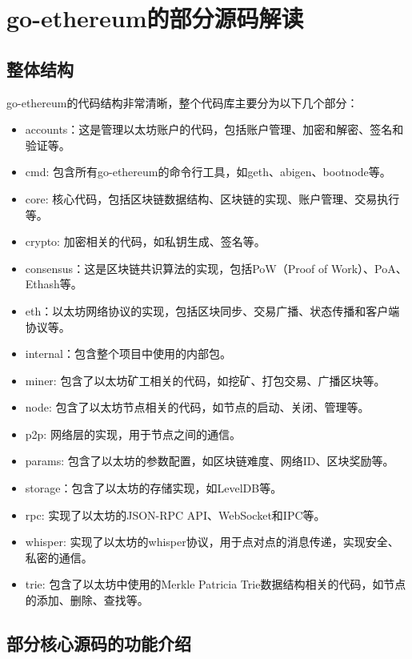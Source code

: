 
\chapter{go-ethereum的部分源码解读}

\section{整体结构}

go-ethereum的代码结构非常清晰，整个代码库主要分为以下几个部分：

\begin{itemize}
    \item accounts：这是管理以太坊账户的代码，包括账户管理、加密和解密、签名和验证等。
    \item cmd: 包含所有go-ethereum的命令行工具，如geth、abigen、bootnode等。
    \item core: 核心代码，包括区块链数据结构、区块链的实现、账户管理、交易执行等。
    \item crypto: 加密相关的代码，如私钥生成、签名等。
    \item consensus：这是区块链共识算法的实现，包括PoW（Proof of Work）、PoA、Ethash等。
    \item eth：以太坊网络协议的实现，包括区块同步、交易广播、状态传播和客户端协议等。
    \item internal：包含整个项目中使用的内部包。
    \item miner: 包含了以太坊矿工相关的代码，如挖矿、打包交易、广播区块等。
    \item node: 包含了以太坊节点相关的代码，如节点的启动、关闭、管理等。
    \item p2p: 网络层的实现，用于节点之间的通信。
    \item params: 包含了以太坊的参数配置，如区块链难度、网络ID、区块奖励等。
    \item storage：包含了以太坊的存储实现，如LevelDB等。
    \item rpc: 实现了以太坊的JSON-RPC API、WebSocket和IPC等。
    \item whisper: 实现了以太坊的whisper协议，用于点对点的消息传递，实现安全、私密的通信。
    \item trie: 包含了以太坊中使用的Merkle Patricia Trie数据结构相关的代码，如节点的添加、删除、查找等。
\end{itemize}

\section{部分核心源码的功能介绍}

